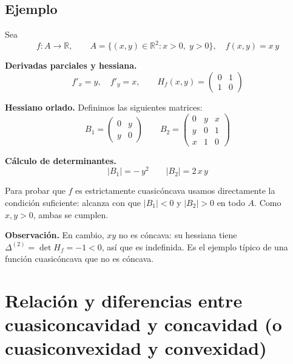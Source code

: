 \documentclass{article}
\newcommand{\R}{\ensuremath{\mathbb{R}}}
\begin{document}
\subsection*{Ejemplo}

Sea
\[
f\colon A\to\R,
\qquad
A=\{(x,y)\in\R^2:x>0,\;y>0\},
\quad
f(x,y)=x\,y
\]

\medskip

\noindent\textbf{Derivadas parciales y hessiana.}
\[
f'_x = y,\quad f'_y = x,
\qquad
H_f(x,y)
= \begin{pmatrix}
0 & 1\\[4pt]
1 & 0
\end{pmatrix}
\]

\medskip

\noindent\textbf{Hessiano orlado.} Definimos las siguientes matrices:
\[
B_1 =
\begin{pmatrix}
0 & y\\[4pt]
y & 0
\end{pmatrix}
\qquad
B_2 =
\begin{pmatrix}
0 & y & x\\[4pt]
y & 0 & 1\\[4pt]
x & 1 & 0
\end{pmatrix}
\]

\medskip

\noindent\textbf{Cálculo de determinantes.}
\[
|B_1| = -\,y^2
\qquad
|B_2| = 2\,x\,y
\]

\medskip

Para probar que \(f\) es estrictamente cuasicóncava usamos directamente la condición suficiente: alcanza con que \(|B_1|<0\) y \(|B_2|>0\) en todo \(A\). Como \(x,y>0\), ambas se cumplen.


\medskip

\noindent\textbf{Observación.} En cambio, \(xy\) no es cóncava: su hessiana tiene \(\Delta^{(2)}=\det H_f=-1<0\), así que es indefinida. Es el ejemplo típico de una función cuasicóncava que no es cóncava.


\section*{Relación y diferencias entre cuasiconcavidad y concavidad (o cuasiconvexidad y convexidad)}
\end{document}
